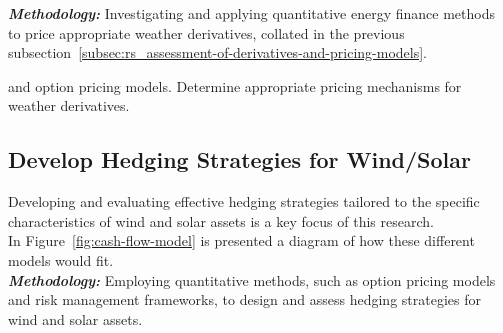 \textbf{\textit{Methodology: }} Investigating and applying quantitative energy finance methods\cite{benth_quantitative_2014} to price appropriate
    weather derivatives, collated in the previous subsection~\ref{subsec:rs_assessment-of-derivatives-and-pricing-models}.

and option pricing models.
Determine appropriate pricing mechanisms for weather derivatives.

\subsection{Develop Hedging Strategies for Wind/Solar}
    \label{subsec:rs_exploration-of-hedging-strategies-for-wind/solar}

    Developing and evaluating effective hedging strategies tailored to the specific
    characteristics of wind and solar assets is a key focus of this research.\\
    In Figure~\ref{fig:cash-flow-model} is presented a diagram of how these different models would fit.\\

    \textbf{\textit{Methodology: }} Employing quantitative methods, such as option pricing models and risk management
    frameworks, to design and assess hedging strategies for wind and solar assets.

